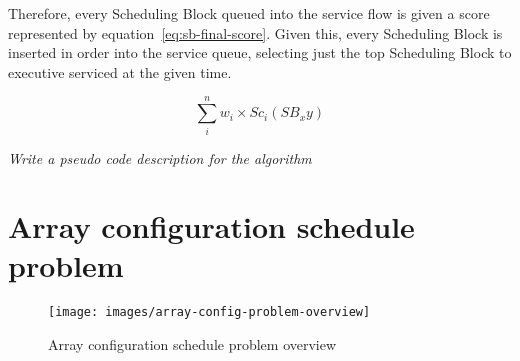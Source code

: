 Therefore, every Scheduling Block queued into the service flow is given a score represented by equation~\ref{eq:sb-final-score}. Given this, every Scheduling Block is inserted in order into the service queue, selecting just the top Scheduling Block to executive serviced at the given time.

\begin{equation}
\label{eq:sb-final-score}
\sum_{i}^{n} w_i\times Sc_i(SB_xy)
\end{equation}


\textit{Write a pseudo code description for the algorithm}

\section{Array configuration schedule problem}
\begin{figure}[h!]
\begin{center}
\texttt{[image: images/array-config-problem-overview]}
\caption{Array configuration schedule problem overview}
\end{center}
\label{fig:array-config-problem-overview}
\end{figure}
